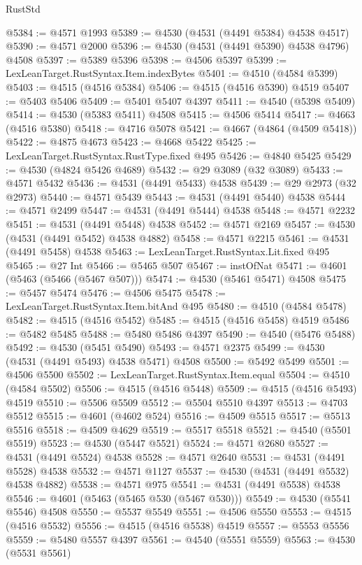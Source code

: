 \begin{lexlean}{RustStd}
\begin{coremodule}
{\begin{coremodule}
{{{{{{{{{{{{{{{{{{{{{{{{{{{{{{{{{{{{{{{{{{{{{{{{{{{{{{{@5384 := @4571 @1993
@5389 := @4530 (@4531 (@4491 @5384) @4538 @4517)
@5390 := @4571 @2000
@5396 := @4530 (@4531 (@4491 @5390) @4538 @4796) @4508
@5397 := @5389 @5396
@5398 := @4506 @5397
@5399 := LexLeanTarget.RustSyntax.Item.indexBytes
@5401 := @4510 (@4584 @5399)
@5403 := @4515 (@4516 @5384)
@5406 := @4515 (@4516 @5390) @4519
@5407 := @5403 @5406
@5409 := @5401 @5407 @4397
@5411 := @4540 (@5398 @5409)
@5414 := @4530 (@5383 @5411) @4508
@5415 := @4506 @5414
@5417 := @4663 (@4516 @5380)
@5418 := @4716 @5078
@5421 := @4667 (@4864 (@4509 @5418))
@5422 := @4875 @4673
@5423 := @4668 @5422
@5425 := LexLeanTarget.RustSyntax.RustType.fixed @495
@5426 := @4840 @5425
@5429 := @4530 (@4824 @5426 @4689)
@5432 := @29 @3089 (@32 @3089)
@5433 := @4571 @5432
@5436 := @4531 (@4491 @5433) @4538
@5439 := @29 @2973 (@32 @2973)
@5440 := @4571 @5439
@5443 := @4531 (@4491 @5440) @4538
@5444 := @4571 @2499
@5447 := @4531 (@4491 @5444) @4538
@5448 := @4571 @2232
@5451 := @4531 (@4491 @5448) @4538
@5452 := @4571 @2169
@5457 := @4530 (@4531 (@4491 @5452) @4538 @4882)
@5458 := @4571 @2215
@5461 := @4531 (@4491 @5458) @4538
@5463 := LexLeanTarget.RustSyntax.Lit.fixed @495
@5465 := @27 Int
@5466 := @5465 @507
@5467 := instOfNat
@5471 := @4601 (@5463 (@5466 (@5467 @507)))
@5474 := @4530 (@5461 @5471) @4508
@5475 := @5457 @5474
@5476 := @4506 @5475
@5478 := LexLeanTarget.RustSyntax.Item.bitAnd @495
@5480 := @4510 (@4584 @5478)
@5482 := @4515 (@4516 @5452)
@5485 := @4515 (@4516 @5458) @4519
@5486 := @5482 @5485
@5488 := @5480 @5486 @4397
@5490 := @4540 (@5476 @5488)
@5492 := @4530 (@5451 @5490)
@5493 := @4571 @2375
@5499 := @4530 (@4531 (@4491 @5493) @4538 @5471) @4508
@5500 := @5492 @5499
@5501 := @4506 @5500
@5502 := LexLeanTarget.RustSyntax.Item.equal
@5504 := @4510 (@4584 @5502)
@5506 := @4515 (@4516 @5448)
@5509 := @4515 (@4516 @5493) @4519
@5510 := @5506 @5509
@5512 := @5504 @5510 @4397
@5513 := @4703 @5512
@5515 := @4601 (@4602 @524)
@5516 := @4509 @5515
@5517 := @5513 @5516
@5518 := @4509 @4629
@5519 := @5517 @5518
@5521 := @4540 (@5501 @5519)
@5523 := @4530 (@5447 @5521)
@5524 := @4571 @2680
@5527 := @4531 (@4491 @5524) @4538
@5528 := @4571 @2640
@5531 := @4531 (@4491 @5528) @4538
@5532 := @4571 @1127
@5537 := @4530 (@4531 (@4491 @5532) @4538 @4882)
@5538 := @4571 @975
@5541 := @4531 (@4491 @5538) @4538
@5546 := @4601 (@5463 (@5465 @530 (@5467 @530)))
@5549 := @4530 (@5541 @5546) @4508
@5550 := @5537 @5549
@5551 := @4506 @5550
@5553 := @4515 (@4516 @5532)
@5556 := @4515 (@4516 @5538) @4519
@5557 := @5553 @5556
@5559 := @5480 @5557 @4397
@5561 := @4540 (@5551 @5559)
@5563 := @4530 (@5531 @5561)
}}}}}}}}}}}}}}}}}}}}}}}}}}}}}}}}}}}}}}}}}}}}}}}}}}}}}}}
\end{coremodule}}
\end{coremodule}
\end{lexlean}
